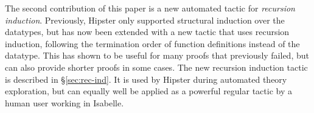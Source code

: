 The second contribution of this paper is a new automated tactic for \emph{recursion induction}.
%
Previously, Hipster only supported structural induction over the datatypes, but has now been extended with a new tactic that uses recursion induction, following the termination order of function definitions instead of the datatype.
%
This has shown to be useful for many proofs that previously failed, but can also provide shorter proofs in some cases.
%
The new recursion induction tactic is described in \S \ref{sec:rec-ind}.
%
It is used by Hipster during automated theory exploration, but can equally well be applied as a powerful regular tactic by a human user working in Isabelle.
